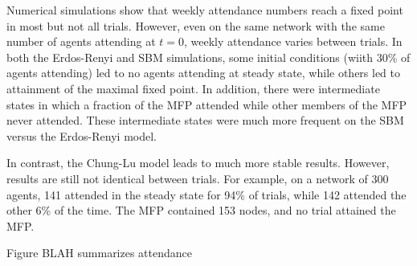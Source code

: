 \documentclass[12pt]{article}
\begin{document}
Numerical simulations show that weekly attendance numbers reach a fixed point in most but not all trials.  However, even on the same network with the same number of agents attending at $t=0$, weekly attendance varies between trials.  In both the Erdos-Renyi and SBM simulations, some initial conditions (wiith 30\% of agents attending) led to no agents attending at steady state, while others led to attainment of the maximal fixed point.  In addition, there were intermediate states in which a fraction of the MFP attended while other members of the MFP never attended.  These intermediate states were much more frequent on the SBM versus the Erdos-Renyi model. 

In contrast, the Chung-Lu model leads to much more stable results.  However, results are still not identical between trials.  For example, on a network of 300 agents, 141 attended in the steady state for 94\% of trials, while 142 attended the other 6\% of the time.  The MFP contained 153 nodes, and no trial attained the MFP.

Figure BLAH summarizes  attendance
\end{document}
